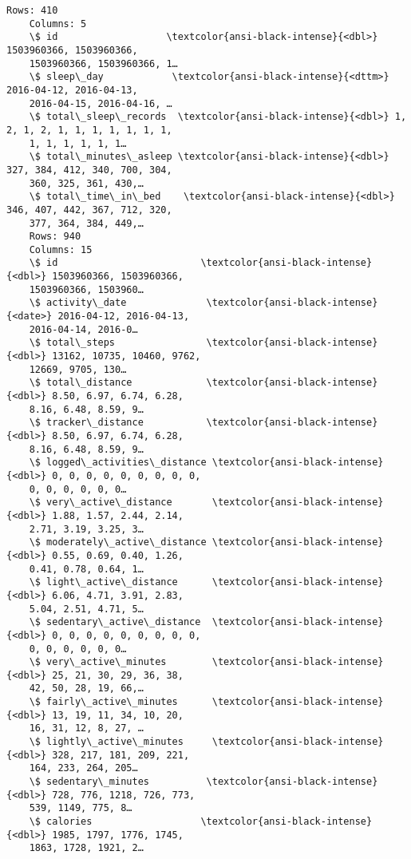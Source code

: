 \documentclass[11pt]{article}
\begin{document}
\begin{Verbatim}[commandchars=\\\{\}]
    Rows: 410
    Columns: 5
    \$ id                   \textcolor{ansi-black-intense}{<dbl>} 1503960366, 1503960366,
    1503960366, 1503960366, 1…
    \$ sleep\_day            \textcolor{ansi-black-intense}{<dttm>} 2016-04-12, 2016-04-13,
    2016-04-15, 2016-04-16, …
    \$ total\_sleep\_records  \textcolor{ansi-black-intense}{<dbl>} 1, 2, 1, 2, 1, 1, 1, 1, 1, 1, 1,
    1, 1, 1, 1, 1, 1…
    \$ total\_minutes\_asleep \textcolor{ansi-black-intense}{<dbl>} 327, 384, 412, 340, 700, 304,
    360, 325, 361, 430,…
    \$ total\_time\_in\_bed    \textcolor{ansi-black-intense}{<dbl>} 346, 407, 442, 367, 712, 320,
    377, 364, 384, 449,…
    Rows: 940
    Columns: 15
    \$ id                         \textcolor{ansi-black-intense}{<dbl>} 1503960366, 1503960366,
    1503960366, 1503960…
    \$ activity\_date              \textcolor{ansi-black-intense}{<date>} 2016-04-12, 2016-04-13,
    2016-04-14, 2016-0…
    \$ total\_steps                \textcolor{ansi-black-intense}{<dbl>} 13162, 10735, 10460, 9762,
    12669, 9705, 130…
    \$ total\_distance             \textcolor{ansi-black-intense}{<dbl>} 8.50, 6.97, 6.74, 6.28,
    8.16, 6.48, 8.59, 9…
    \$ tracker\_distance           \textcolor{ansi-black-intense}{<dbl>} 8.50, 6.97, 6.74, 6.28,
    8.16, 6.48, 8.59, 9…
    \$ logged\_activities\_distance \textcolor{ansi-black-intense}{<dbl>} 0, 0, 0, 0, 0, 0, 0, 0, 0,
    0, 0, 0, 0, 0, 0…
    \$ very\_active\_distance       \textcolor{ansi-black-intense}{<dbl>} 1.88, 1.57, 2.44, 2.14,
    2.71, 3.19, 3.25, 3…
    \$ moderately\_active\_distance \textcolor{ansi-black-intense}{<dbl>} 0.55, 0.69, 0.40, 1.26,
    0.41, 0.78, 0.64, 1…
    \$ light\_active\_distance      \textcolor{ansi-black-intense}{<dbl>} 6.06, 4.71, 3.91, 2.83,
    5.04, 2.51, 4.71, 5…
    \$ sedentary\_active\_distance  \textcolor{ansi-black-intense}{<dbl>} 0, 0, 0, 0, 0, 0, 0, 0, 0,
    0, 0, 0, 0, 0, 0…
    \$ very\_active\_minutes        \textcolor{ansi-black-intense}{<dbl>} 25, 21, 30, 29, 36, 38,
    42, 50, 28, 19, 66,…
    \$ fairly\_active\_minutes      \textcolor{ansi-black-intense}{<dbl>} 13, 19, 11, 34, 10, 20,
    16, 31, 12, 8, 27, …
    \$ lightly\_active\_minutes     \textcolor{ansi-black-intense}{<dbl>} 328, 217, 181, 209, 221,
    164, 233, 264, 205…
    \$ sedentary\_minutes          \textcolor{ansi-black-intense}{<dbl>} 728, 776, 1218, 726, 773,
    539, 1149, 775, 8…
    \$ calories                   \textcolor{ansi-black-intense}{<dbl>} 1985, 1797, 1776, 1745,
    1863, 1728, 1921, 2…
\end{Verbatim}
\end{document}
